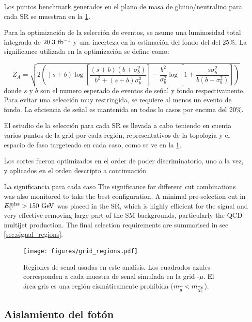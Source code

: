 Los puntos benchmark generados en el plano de masa de gluino/neutralino para cada SR se muestran en la
\cref{fig:SRegions}.

Para la optimización de la selección de eventos, se asume una luminosidad total integrada de
$20.3~\mbox{fb$^{-1}$}$ y una incerteza en la estimación del fondo del {\SM} del 25\%. La significance
utilizada en la optimización se define como:

\begin{equation*}
  Z_A = \sqrt{2 \left( (s + b) \log\left[\frac{(s + b) (b + \sigma_b^2)}{b^2 + (s + b) \sigma_b^2}\right] - \frac{b^2}{\sigma_b^2} \log\left[1 + \frac{s \sigma_b^2}{b (b + \sigma_b^2)}\right] \right)}
\end{equation*}
%
donde $s$ y $b$ son el numero esperado de eventos de señal y fondo respectivamente. Para evitar
una selección muy restringida, se requiere al menos un evento de fondo. La eficiencia de señal
es mantenida en todos lo casos por encima del 20\%.

El estudio de la selección para cada SR es llevada a cabo teniendo en cuenta
varios puntos de la grid por cada región, representativos de la topología y el
espacio de faso targeteado en cada caso, como se ve en la \cref{fig:SRegions}.

Los cortes fueron optimizados en el order de poder discriminatorio, uno a la vez, y aplicados
en el orden descripto a continuación

La significancia para cada caso
The significance for different cut combinations was also monitored to take the best configuration.
A minimal pre-selection cut in $\met>150\gev$ was placed in the SR, which is highly efficient for the signal and very effective
removing large part of the SM backgrounds, particularly the QCD multijet production. The final selection requirements are summarised in sec \ref{sec:signal_regions}.

\begin{figure}[h!]
  \centering
  \texttt{[image: figures/grid\_regions.pdf]}
  \caption{Regiones de senal usadas en este analisis.
    Los cuadrados azules corresponden a cada muestra de senal simulada en la
    grid -$\mu$.
    El área gris es una región cismáticamente prohibida ($m_{\gluino}<m_{\ninoone}$).}\label{fig:SRegions}
\end{figure}

\subsection{Aislamiento del fotón}\label{sec:opt_ph_iso}

